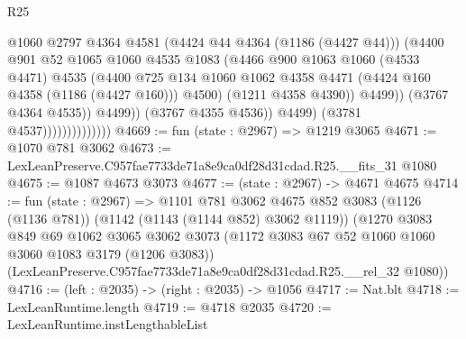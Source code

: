 \begin{lexlean}{R25}
\begin{coremodule}
                                          @1060
                                          @2797
                                          @4364
                                          @4581
                                          (@4424 @44 @4364 (@1186 (@4427 @44)))
                                          (@4400
                                            @901
                                            @52
                                            @1065
                                            @1060
                                            @4535
                                            @1083
                                            (@4466
                                              @900
                                              @1063
                                              @1060
                                              (@4533 @4471)
                                              @4535
                                              (@4400
                                                @725
                                                @134
                                                @1060
                                                @1062
                                                @4358
                                                @4471
                                                (@4424 @160 @4358 (@1186 (@4427 @160)))
                                                @4500)
                                              (@1211 @4358 @4390))
                                            @4499))
                                        (@3767 @4364 @4535))
                                      @4499))
                                  (@3767 @4355 @4536))
                                @4499)
                              (@3781 @4537))))))))))))))
@4669 := fun (state : @2967) => @1219 @3065
@4671 := @1070 @781 @3062
@4673 := LexLeanPreserve.C957fae7733de71a8e9ca0df28d31cdad.R25.__fits_31 @1080
@4675 := @1087 @4673 @3073
@4677 := (state : @2967) -> @4671 @4675
@4714 := fun (state : @2967) =>
  @1101
    @781
    @3062
    @4675
    @852
    @3083
    (@1126 (@1136 @781))
    (@1142 (@1143 (@1144 @852) @3062 @1119))
    (@1270
      @3083
      @849
      @69
      @1062
      @3065
      @3062
      @3073
      (@1172 @3083 @67 @52 @1060 @1060 @3060 @1083 @3179 (@1206 @3083))
      (LexLeanPreserve.C957fae7733de71a8e9ca0df28d31cdad.R25.__rel_32 @1080))
@4716 := (left : @2035) -> (right : @2035) -> @1056
@4717 := Nat.blt
@4718 := LexLeanRuntime.length
@4719 := @4718 @2035
@4720 := LexLeanRuntime.instLengthableList

\end{coremodule}
\end{lexlean}
